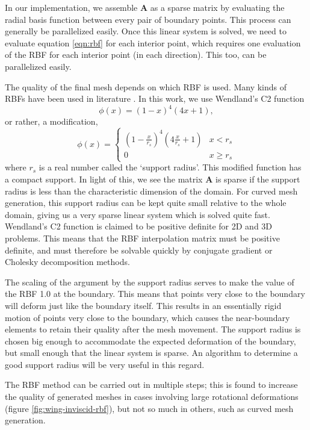  In our implementation, we assemble $\mathbf{A}$ as a sparse matrix by evaluating the radial basis function between every pair of boundary points. This process can generally be parallelized easily. Once this linear system is solved, we need to evaluate equation \eqref{eqn:rbf} for each interior point, which requires one evaluation of the RBF for each interior point (in each direction). This too, can be parallelized easily.
 
 The quality of the final mesh depends on which RBF is used. Many kinds of RBFs have been used in literature \cite{mm:rbf, mm:rbf2}. In this work, we use Wendland's C2 function
 \begin{equation}
 \phi(x) = (1-x)^4(4x + 1),
 \end{equation}
 or rather, a modification,
 \begin{equation}
 \phi(x) = 
 \begin{cases}
 \left(1-\frac{x}{r_s}\right)^4\left(4\frac{x}{r_s} + 1\right) & x < r_s \\
 0 & x \geq r_s
 \end{cases}
 \end{equation}
 where $r_s$ is a real number called the `support radius'. This modified function has a compact support. In light of this, we see the matrix $\mathbf{A}$ is sparse if the support radius is less than the characteristic dimension of the domain. For curved mesh generation, this support radius can be kept quite small relative to the whole domain, giving us a very sparse linear system which is solved quite fast. Wendland's C2 function is claimed to be positive definite \cite{rbf:errorwendland} for 2D and 3D problems. This means that the RBF interpolation matrix must be positive definite, and must therefore be solvable quickly by conjugate gradient or Cholesky decomposition methods.
 
 The scaling of the argument by the support radius serves to make the value of the RBF 1.0 at the boundary. This means that points very close to the boundary will deform just like the boundary itself. This results in an essentially rigid motion of points very close to the boundary, which causes the near-boundary elements to retain their quality after the mesh movement. The support radius is chosen big enough to accommodate the expected deformation of the boundary, but small enough that the linear system is sparse. An algorithm to determine a good support radius will be very useful in this regard.
 
 The RBF method can be carried out in multiple steps; this is found to increase the quality of generated meshes in cases involving large rotational deformations (figure \ref{fig:wing-inviscid-rbf}), but not so much in others, such as curved mesh generation.
 
